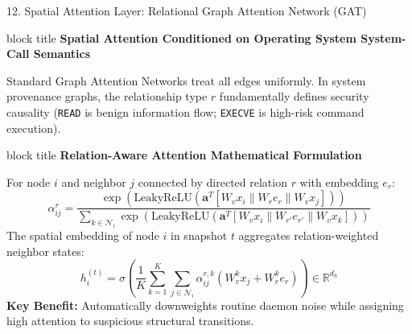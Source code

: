 \documentclass[aspectratio=169,10pt]{beamer}
\begin{document}
\begin{frame}[t]{12. Spatial Attention Layer: Relational Graph Attention Network (GAT)}
\vspace{-0.2em}
\begin{beamercolorbox}[rounded=true,shadow=false,sep=0.30em,wd=\textwidth]{block title}
\textbf{\scriptsize Spatial Attention Conditioned on Operating System System-Call Semantics}
\end{beamercolorbox}
\vspace{0.10em}
{\fontsize{7.2pt}{10.2pt}\selectfont
Standard Graph Attention Networks treat all edges uniformly. In system provenance graphs, the relationship type $r$ fundamentally defines security causality (\texttt{READ} is benign information flow; \texttt{EXECVE} is high-risk command execution).
}

\vspace{0.25em}

\begin{beamercolorbox}[rounded=true,shadow=false,sep=0.30em,wd=\textwidth]{block title}
\textbf{\scriptsize Relation-Aware Attention Mathematical Formulation}
\end{beamercolorbox}
\vspace{0.10em}
{\fontsize{7.0pt}{9.8pt}\selectfont
For node $i$ and neighbor $j$ connected by directed relation $r$ with embedding $e_r$:
\[
\alpha_{ij}^r = \frac{\exp\left(\text{LeakyReLU}\left(\mathbf{a}^T [W_v x_i \parallel W_r e_r \parallel W_v x_j]\right)\right)}{\sum_{k \in \mathcal{N}_i} \exp\left(\text{LeakyReLU}\left(\mathbf{a}^T [W_v x_i \parallel W_{r'} e_{r'} \parallel W_v x_k]\right)\right)}
\]
The spatial embedding of node $i$ in snapshot $t$ aggregates relation-weighted neighbor states:
\[
h_i^{(t)} = \sigma\left(\frac{1}{K}\sum_{k=1}^K \sum_{j \in \mathcal{N}_i} \alpha_{ij}^{r, k} (W_v^k x_j + W_r^k e_r)\right) \in \mathbb{R}^{d_h}
\]
\textbf{Key Benefit:} Automatically downweights routine daemon noise while assigning high attention to suspicious structural transitions.
}
\end{frame}
\end{document}
